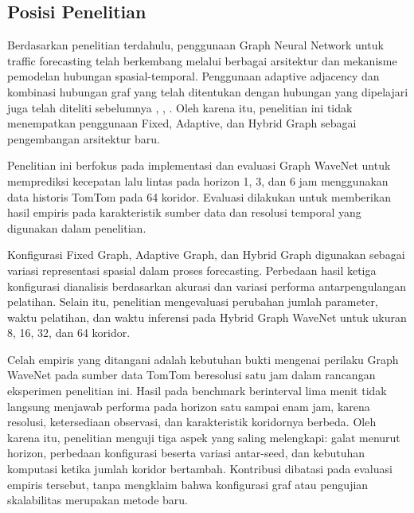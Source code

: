 \subsection{Posisi Penelitian}


Berdasarkan penelitian terdahulu, penggunaan Graph Neural Network untuk traffic forecasting telah berkembang melalui berbagai arsitektur dan mekanisme pemodelan hubungan spasial-temporal. Penggunaan adaptive adjacency dan kombinasi hubungan graf yang telah ditentukan dengan hubungan yang dipelajari juga telah diteliti sebelumnya \cite{wu2019graphwavenet}, \cite{bai2020agcrn}, \cite{zheng2022dynamic}. Oleh karena itu, penelitian ini tidak menempatkan penggunaan Fixed, Adaptive, dan Hybrid Graph sebagai pengembangan arsitektur baru.

Penelitian ini berfokus pada implementasi dan evaluasi Graph WaveNet untuk memprediksi kecepatan lalu lintas pada horizon 1, 3, dan 6 jam menggunakan data historis TomTom pada 64 koridor. Evaluasi dilakukan untuk memberikan hasil empiris pada karakteristik sumber data dan resolusi temporal yang digunakan dalam penelitian.

Konfigurasi Fixed Graph, Adaptive Graph, dan Hybrid Graph digunakan sebagai variasi representasi spasial dalam proses forecasting. Perbedaan hasil ketiga konfigurasi dianalisis berdasarkan akurasi dan variasi performa antarpengulangan pelatihan. Selain itu, penelitian mengevaluasi perubahan jumlah parameter, waktu pelatihan, dan waktu inferensi pada Hybrid Graph WaveNet untuk ukuran 8, 16, 32, dan 64 koridor.

Celah empiris yang ditangani adalah kebutuhan bukti mengenai perilaku Graph WaveNet pada sumber data TomTom beresolusi satu jam dalam rancangan eksperimen penelitian ini. Hasil pada benchmark berinterval lima menit tidak langsung menjawab performa pada horizon satu sampai enam jam, karena resolusi, ketersediaan observasi, dan karakteristik koridornya berbeda. Oleh karena itu, penelitian menguji tiga aspek yang saling melengkapi: galat menurut horizon, perbedaan konfigurasi beserta variasi antar-seed, dan kebutuhan komputasi ketika jumlah koridor bertambah. Kontribusi dibatasi pada evaluasi empiris tersebut, tanpa mengklaim bahwa konfigurasi graf atau pengujian skalabilitas merupakan metode baru.
